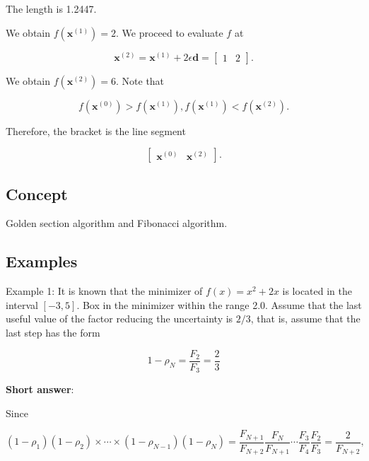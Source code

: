 The length is 1.2447.

We obtain \(f\left(\boldsymbol{x}^{(1)}\right)=2\). We proceed to evaluate \(f\) at

\begin{equation*}
	\boldsymbol{x}^{(2)}=\boldsymbol{x}^{(1)}+2 \epsilon \boldsymbol{d}=\left[\begin{array}{ll}
		1 & 2
	\end{array}\right] .
\end{equation*}

We obtain \(f\left(\boldsymbol{x}^{(2)}\right)=6\). Note that

\begin{equation*}
	f\left(\boldsymbol{x}^{(0)}\right)>f\left(\boldsymbol{x}^{(1)}\right), f\left(\boldsymbol{x}^{(1)}\right)<f\left(\boldsymbol{x}^{(2)}\right) .
\end{equation*}

Therefore, the bracket is the line segment

\begin{equation*}
	\left[\begin{array}{ll}
		\boldsymbol{x}^{(0)} & \boldsymbol{x}^{(2)}
	\end{array}\right] .
\end{equation*}


\subsection{Concept}
Golden section algorithm and Fibonacci algorithm.

\subsection{Examples}
Example 1: It is known that the minimizer of \(f(x)=x^{2}+2 x\) is located in the interval \([-3,5]\). Box in the minimizer within the range 2.0. Assume that the last useful value of the factor reducing the uncertainty is \(2 / 3\), that is, assume that the last step has the form

\begin{equation*}
	1-\rho_{N}=\frac{F_{2}}{F_{3}}=\frac{2}{3}
\end{equation*}


\textbf{Short answer}:

Since

\begin{equation*}
	\left(1-\rho_{1}\right)\left(1-\rho_{2}\right) \times \cdots \times\left(1-\rho_{N-1}\right)\left(1-\rho_{N}\right)=\frac{F_{N+1}}{F_{N+2}} \frac{F_{N}}{F_{N+1}} \cdots \frac{F_{3}}{F_{4}} \frac{F_{2}}{F_{3}}=\frac{2}{F_{N+2}},
\end{equation*}


